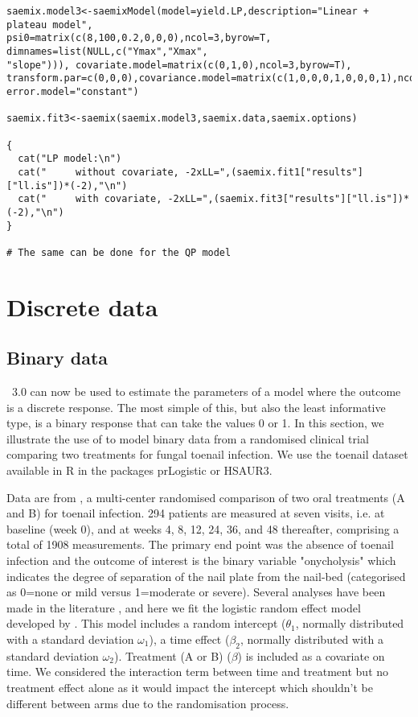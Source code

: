 {\begin{verbatim}
saemix.model3<-saemixModel(model=yield.LP,description="Linear + plateau model",  
psi0=matrix(c(8,100,0.2,0,0,0),ncol=3,byrow=T, dimnames=list(NULL,c("Ymax","Xmax", 
"slope"))), covariate.model=matrix(c(0,1,0),ncol=3,byrow=T), 
transform.par=c(0,0,0),covariance.model=matrix(c(1,0,0,0,1,0,0,0,1),ncol=3,byrow=T), 
error.model="constant")

saemix.fit3<-saemix(saemix.model3,saemix.data,saemix.options)

{
  cat("LP model:\n")
  cat("     without covariate, -2xLL=",(saemix.fit1["results"]["ll.is"])*(-2),"\n")
  cat("     with covariate, -2xLL=",(saemix.fit3["results"]["ll.is"])*(-2),"\n")
}

# The same can be done for the QP model
\end{verbatim}

\section{Discrete data}

\subsection{Binary data} \label{sec:toenail}

\monolix~3.0 can now be used to estimate the parameters of a model where the outcome is a discrete response. The most simple of this, but also the least informative type, is a binary response that can take the values 0 or 1. In this section, we illustrate the use of \monolix to model binary data from a randomised clinical trial comparing two treatments for fungal toenail infection. We use the {\sf toenail} dataset available in {\sf R} in the packages {\sf prLogistic} or {\sf HSAUR3}.

Data are from \cite{debacker_toenail}, a multi-center randomised comparison  of two oral treatments (A and B) for toenail infection. 294 patients are measured at seven visits, i.e. at baseline (week 0), and at weeks 4, 8, 12, 24, 36, and 48 thereafter, comprising a total of 1908 measurements. The primary end point was the absence of toenail infection and the outcome of interest is the binary variable "onycholysis" which indicates the degree of separation of the nail plate from the nail-bed (categorised as 0=none or mild versus 1=moderate or severe). 
Several analyses have been made in the literature \cite{lesaffre2001effect,lin2011goodness}, and here we fit the logistic random effect model developed by \cite{hedeker1994random}. This model includes a random intercept ($\theta_1$, normally distributed with a standard deviation $\omega_1$),  a time effect ($\beta_2$, normally distributed with a standard deviation $\omega_2$). Treatment (A or B) ($\beta$) is included as a covariate on time. We considered the interaction term between time and treatment but no treatment effect alone as it would impact the intercept which shouldn't be different between arms due to the randomisation process. 

}
